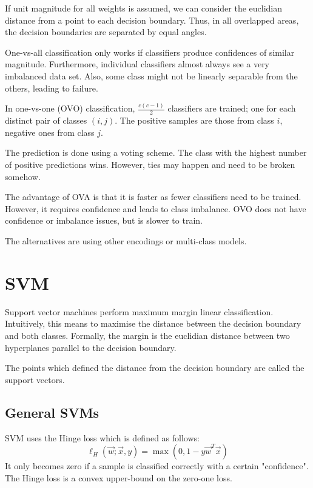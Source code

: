 If unit magnitude for all weights is assumed,
we can consider the euclidian distance from a point
to each decision boundary.
Thus, in all overlapped areas, the decision boundaries
are separated by equal angles.

One-vs-all classification only works if classifiers produce
confidences of similar magnitude.
Furthermore, individual classifiers almost always see
a very imbalanced data set.
Also, some class might not be linearly separable from the
others, leading to failure.

In one-vs-one (OVO) classification,
$\frac{c (c - 1)}{2}$ classifiers are trained;
one for each distinct pair of classes $(i, j)$.
The positive samples are those from class $i$,
negative ones from class $j$.

The prediction is done using a voting scheme.
The class with the highest number of positive predictions wins.
However, ties may happen and need to be broken somehow.

The advantage of OVA is that it is faster as fewer classifiers
need to be trained. However, it requires confidence and leads
to class imbalance.
OVO does not have confidence or imbalance issues,
but is slower to train.

The alternatives are using other encodings or
multi-class models.


\section{SVM}
Support vector machines perform maximum margin linear classification.
Intuitively, this means to maximise the distance between the decision
boundary and both classes.
Formally, the margin is the euclidian distance
between two hyperplanes parallel to the decision boundary.

The points which defined the distance from the decision
boundary are called the support vectors.


\subsection{General SVMs}

SVM uses the Hinge loss which is defined as follows:
\begin{equation*}
\ell_H(\vec{w}; \vec{x}, y) =
\max(0, 1 - y \vec{w}^T \vec{x})
\end{equation*}
It only becomes zero if a sample is classified correctly
with a certain "confidence".
The Hinge loss is a convex upper-bound on the
zero-one loss.

